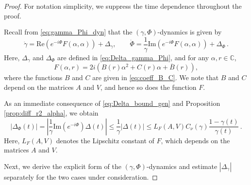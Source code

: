 \documentclass[10pt]{article}
\theoremstyle{definition}
\theoremstyle{definition}
\numberwithin{equation}{section}
\newcommand{\BBC}{\mathbb{C}}
\newcommand{\im}[1]{\mathrm{Im} \left(#1\right)}
\newcommand{\re}[1]{\mathrm{Re}\left(#1\right)}
\newcommand{\Dgamma}{\Dot{\gamma}}
\newcommand{\DPhi}{\Dot{\Phi}}
\newcommand{\DeltaGamma}{\Delta_{\gamma}}
\newcommand{\DeltaPhi}{\Delta_{\Phi}}
\begin{document}
\begin{proof}
For notation simplicity, we suppress the time dependence throughout the proof.

Recall from \eqref{eq:gamma_Phi_dyn} that the $(\gamma, \Phi)$-dynamics is given by
\begin{equation*}
\Dgamma = \re{e^{-i\Phi} F(\alpha, \alpha)} + \Delta_{\gamma}, \qquad
\DPhi = \frac{1}{\gamma} \im{e^{-i\Phi} F(\alpha, \alpha)} + \Delta_{\Phi} \,.
\end{equation*}
Here, $\DeltaGamma$ and $\DeltaPhi$ are defined in \eqref{eq:Delta_gamma_Phi}, and for any $\alpha, r \in \BBC$,
\begin{equation*}
F(\alpha, r) = 2i \left( B(r) \alpha^2 + C(r) \alpha + \overline{B}(r) \right),
\end{equation*}
where the functions $B$ and $C$ are given in \eqref{eq:coeff_B_C}.
We note that $B$ and $C$ depend on the matrices $A$ and $V$, and hence so does the function $F$.

As an immediate consequence of \eqref{eq:Delta_bound_gen} and Proposition \ref{prop:diff_r2_alpha}, we obtain
\begin{equation}\label{eq:Delta_Phi_control}
|\DeltaPhi(t)| = \left| \frac{1}{\gamma} \im{e^{-i\Phi}} \Delta(t) \right| \leq \frac{1}{\gamma} |\Delta(t)| \leq L_F (A,V) C_{\nu}(\gamma) \frac{1 - \gamma(t)}{\gamma(t)}\, .
\end{equation}
Here, $L_F (A,V)$ denotes the Lipschitz constant of $F$, which depends on the matrices $A$ and $V$. 

Next, we derive the explicit form of the $(\gamma, \Phi)$-dynamics and estimate $|\DeltaGamma|$ separately for the two cases under consideration.


\end{proof}
\end{document}
